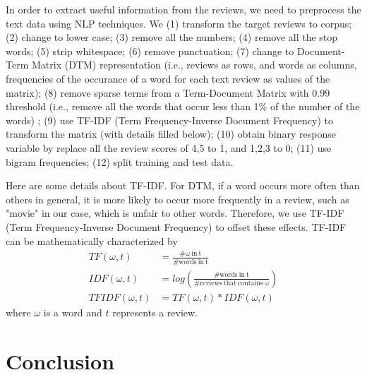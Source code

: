 \documentclass[12pt]{article}
\begin{document}
In order to extract useful information from the reviews, we need to preprocess the text data using NLP techniques. We (1) transform the target reviews to corpus; (2) change to lower case; (3) remove all the numbers; (4) remove all the stop words; (5) strip whitespace;  (6) remove punctuation; (7) change to Document-Term Matrix (DTM) representation (i.e., reviews as rows, and words as columns, frequencies of the occurance of a word for each text review as values of the matrix); (8) remove sparse terms from a Term-Document Matrix with 0.99 threshold (i.e., remove all the words that occur less than 1\% of the number of the words) ; (9) use TF-IDF (Term Frequency-Inverse Document Frequency) to transform the matrix (with details filled below); (10) obtain binary response variable by replace all the review scores of 4,5 to 1, and 1,2,3 to 0; (11) use bigram frequencies; (12) split training and test data. 

Here are some details about TF-IDF. For DTM, if a word occurs more often than others in general, it is more likely to occur more frequently in a review, such as "movie" in our case, which is unfair to other words. Therefore, we use TF-IDF (Term Frequency-Inverse Document Frequency) to offset these effects. TF-IDF can be mathematically characterized by 
\begin{equation}
\begin{aligned}
TF(\omega,t)&=\frac{\mathrm{\#\omega~in~t}}{\mathrm{\#words~in~t}}\\
IDF(\omega,t)&=log(\frac{\mathrm{\#words~in~t}}{\mathrm{\#reviews~that~contains~\omega}})\\
TFIDF(\omega,t) &= TF(\omega,t)*IDF(\omega,t)
\end{aligned}
\end{equation}
where $\omega$ is a word and $t$ represents a review. 

\subsection{}


\section{Conclusion}
\end{document}
